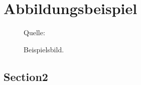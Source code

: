 \chapter{Abbildungsbeispiel}
\begin{figure}[htbp]
	\centering
	\caption{Beispielsbild.}
	\label{androiduebersicht}
	Quelle: %
\end{figure}
\section{Section2}
\lipsum[61-70]
\cleardoubleemptypage %
